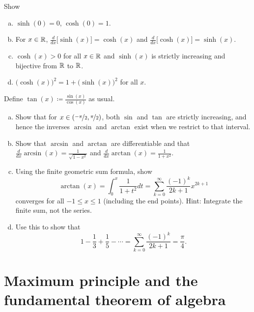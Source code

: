 \begin{exercise}
Show
\begin{enumerate}[a)]
\item
$\sinh(0) = 0$, $\cosh(0) = 1$.
\item
For $x \in {\mathbb{R}}$,
$\frac{d}{dx} \bigl[ \sinh(x) \bigr] = \cosh(x)$ and
$\frac{d}{dx} \bigl[ \cosh(x) \bigr] = \sinh(x)$.
\item
$\cosh(x) > 0$ for all $x \in {\mathbb{R}}$ and
$\sinh(x)$ is strictly increasing and bijective
from ${\mathbb{R}}$ to ${\mathbb{R}}$.
\item
${\bigl(\cosh(x)\bigr)}^2 = 1 + {\bigl(\sinh(x)\bigr)}^2$ for all
$x$.
\end{enumerate}
\end{exercise}

\begin{exercise}
Define $\tan(x) \coloneqq \frac{\sin(x)}{\cos(x)}$ as usual.
\begin{enumerate}[a)]
\item
Show that for $x \in (\nicefrac{-\pi}{2},\nicefrac{\pi}{2})$,
both $\sin$ and $\tan$ are strictly increasing, and hence
the inverses $\arcsin$
and $\arctan$ exist when we restrict to that interval.
\item
Show that $\arcsin$ and $\arctan$ are differentiable
and
that
$\frac{d}{dx} \arcsin(x) = \frac{1}{\sqrt{1-x^2}}$ and
$\frac{d}{dx} \arctan(x) = \frac{1}{1+x^2}$.
\item
Using the finite geometric sum formula, show
\begin{equation*}
\arctan(x) = \int_0^x \frac{1}{1+t^2} dt
=
\sum_{k=0}^\infty \frac{{(-1)}^k}{2k+1} x^{2k+1}
\end{equation*}
converges for all $-1 \leq x \leq 1$ (including the end points).
Hint: Integrate the finite sum, not the series.
\item
Use this to show that
\begin{equation*}
1 - \frac{1}{3} + \frac{1}{5} - \cdots
=
\sum_{k=0}^\infty \frac{{(-1)}^k}{2k+1}
=
\frac{\pi}{4} .
\end{equation*}
\end{enumerate}
\end{exercise}


\sectionnewpage
\section[Maximum principle and fundamental theorem of algebra]{Maximum principle and the fundamental theorem of algebra}
\label{sec:fundalgeb}

